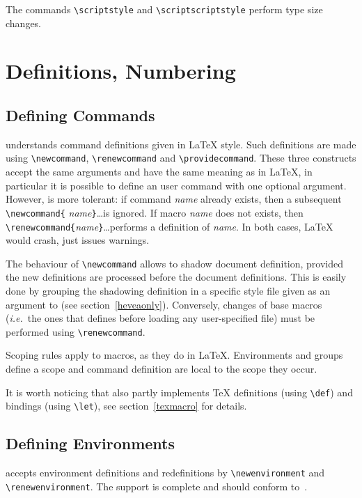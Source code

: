The commands \verb+\scriptstyle+ and \verb+\scriptscriptstyle+
perform type size changes.

\section{Definitions, Numbering}

\subsection{Defining Commands}\label{usermacro}

\hevea{} understands command definitions given in \LaTeX{} style. Such
definitions are made using
\verb+\newcommand+, \verb+\renewcommand+ and \verb+\providecommand+.
These three constructs accept the same arguments and have the same
meaning as in \LaTeX{}, in particular it is possible to define an user
command with one optional argument.
However, \hevea{} is more tolerant: if command
{\it name} already exists, then a subsequent \verb+\newcommand{+{\it
name}\verb+}+\ldots is ignored.  If macro {\it name} does not exists, then
\verb+\renewcommand{+{\it name}\verb+}+\ldots performs{} a definition of {\it
name}.  In both cases, \LaTeX{} would crash, \hevea{} just issues
warnings.

The behaviour of \verb+\newcommand+ allows to shadow document
definition, provided the new definitions are processed before the
document definitions.
This is easily done by grouping the shadowing definition  in a
specific style file given as an argument to \hevea{} (see section~\ref{heveaonly}).
Conversely, changes of base macros (\emph{i.e.}\ the ones that \hevea{}
defines before loading any user-specified file) must be performed
using \verb+\renewcommand+.



Scoping rules apply to macros, as they do in \LaTeX{}.
Environments and groups define a scope and command definition
are local to the scope they occur.

It is worth noticing that \hevea{} also partly implements \TeX{} definitions
(using \verb+\def+) and bindings (using \verb+\let+), see
section~\ref{texmacro} for details.


\subsection{Defining Environments}
\hevea{} accepts environment definitions and redefinitions
by \verb+\newenvironment+ and \verb+\renewenvironment+.
The support is complete and should conform
to~\cite[Sections~C.8.2]{latex}.



